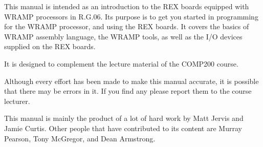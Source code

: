 This manual is intended as an introduction to the REX boards equipped with WRAMP processors in R.G.06.
Its purpose is to get you started in programming for the WRAMP processor, and using the REX boards. It covers the basics of WRAMP assembly language, the WRAMP tools, as well as the I/O devices supplied on the REX boards.

It is designed to complement the lecture material of the COMP200 course.

Although every effort has been made to make this manual accurate, it is
possible that there may be errors in it.  If you find any please report
them to the course lecturer.

This manual is mainly the product of a lot of hard work by Matt Jervis
and Jamie Curtis. Other people that have contributed to its content
are Murray Pearson, Tony McGregor, and Dean Armstrong.
